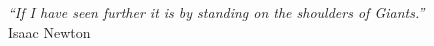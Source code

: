 \cleardoublepage
\thispagestyle{plain}

\vspace*{8cm}

\begin{flushright}
   \textsl{``If I have seen further it is by standing on the shoulders of Giants.''} \\
\vspace*{1.5cm}
           Isaac Newton
\end{flushright}
